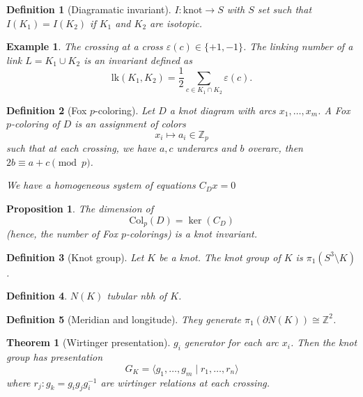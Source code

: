 \documentclass[leqno]{article}
\newtheorem*{theorem}{Theorem}
\newtheorem*{proposition}{Proposition}
\newtheorem*{definition}{Definition}
\newtheorem*{example}{Example}
\begin{document}


\begin{definition}[Diagramatic invariant] $I : \text{knot} \to S$ with $S$ set such that $I(K_1) = I(K_2)$ if $K_1$ and $K_2$ are isotopic.
\end{definition}

\begin{example} The crossing at a cross $ \varepsilon (c) \in \{+1, -1\} $. The linking number of a link $L = K_1 \cup K_2$ is an invariant defined as 
\[
\text{lk}(K_1, K_2) = \frac{1}{2} \sum_{c \in K_1 \cap K_2} \varepsilon(c).
\]
\end{example}

\begin{definition}[Fox $p$-coloring] Let $D$ a knot diagram with arcs $x_1, \ldots, x_m$. A Fox $p$-coloring of $D$ is an assignment of colors
\[
x_i \mapsto a_i \in \mathbb{Z}_p
\]
such that at each crossing, we have $a, c$ underarcs and $b$ overarc, then $2b \equiv a + c \pmod{p}$.

We have a homogeneous system of equations $C_D x = 0$ 

\end{definition}

\begin{proposition} The dimension of 
    \[
    \text{Col}_p(D) = \ker  (C_D)
    \]
(hence, the number of Fox $p$-colorings) is a knot invariant.
\end{proposition}

\begin{definition}[Knot group] Let $K$ be a knot. The knot group of $K$ is $\pi_1(S^3 \setminus K)$.
\end{definition}

\begin{definition} $N(K)$ tubular nbh of $K$.
\end{definition}

\begin{definition}[Meridian and longitude] They generate $\pi _1(\partial N(K)) \cong \mathbb{Z}^2$.
\end{definition}

\begin{theorem}[Wirtinger presentation] $g_i$ generator for each arc $x_i$. Then the knot group has presentation
\[
G_K = \langle g_1, \ldots, g_m \mid r_1, \ldots, r_n \rangle
\]
where $r_j : g_k = g_i g_j g_i^{-1}$ are wirtinger relations at each crossing.
\end{theorem}
\end{document}
